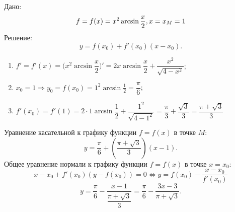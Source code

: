 \documentclass{article}
\begin{document}
\clearpage
Дано:
\begin{equation*}
f = f(x) = x^2\arcsin{\frac x 2}, \\
x=x_M=1
\end{equation*}
Решение:
\begin{equation*}
    y = f(x_0) + f'(x_0)(x-x_0).
\end{equation*}
\begin{enumerate}
    \item $f' = f'(x) = \Big(x^2\arcsin{\dfrac x 2}\Big)' = 2x\arcsin{\dfrac x 2} + \dfrac{x^2}{\sqrt{4-x^2}}$;
    \item $x_0 = 1 \Rightarrow y_0 = f(x_0) =1^2\arcsin{\frac 1 2} = \dfrac{\pi}{6}$;
    \item $f'(x_0) = f'(1) = 2 \cdot 1\arcsin{\dfrac{1}{2}} + \dfrac{1^2}{\sqrt{4-1^2}} = 
    \dfrac{\pi}{3} + \dfrac{\sqrt{3}}{3} = \dfrac{\pi + \sqrt{3}}{3}$
\end{enumerate}
Уравнение касательной к графику функции $f=f(x)$ в точке $M$:
\begin{equation*}
    y = \dfrac \pi 6 + (\dfrac{\pi + \sqrt{3}}{3})(x-1).
\end{equation*}
Общее уравнение нормали к графику функции $f=f(x)$ в точке $x=x_0$:
\begin{equation*}
    x-x_0+f'(x_0)(y-f(x_0))=0 \Leftrightarrow y = f(x_0) - \dfrac{x-x_0}{f'(x_0)}
\end{equation*}
\begin{equation*}
    y=\dfrac{\pi}{6} - \dfrac{x-1}{\dfrac{\pi + \sqrt{3}}{3}} = \dfrac{\pi}{6} - \dfrac{3x-3}{\pi + \sqrt{3}}.
\end{equation*}
\end{document}
